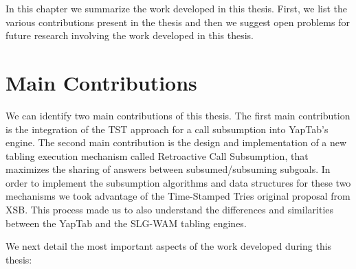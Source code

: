 
In this chapter we summarize the work developed in this thesis. First, we list the various contributions
present in the thesis and then we suggest open problems for future research involving the work
developed in this thesis.

\section{Main Contributions}

We can identify two main contributions of this thesis. The first main contribution is the integration of
the TST approach for a call subsumption into YapTab's engine. The second main contribution is the design and implementation
of a new tabling execution mechanism called Retroactive Call Subsumption, that maximizes the sharing of answers
between subsumed/subsuming subgoals. In order to implement the subsumption algorithms and data structures for
these two mechanisms we took advantage of the Time-Stamped Tries original proposal from XSB.
This process made us to also understand the differences and similarities between the YapTab and the SLG-WAM tabling engines.

We next detail the most important aspects of the work developed during this thesis:

